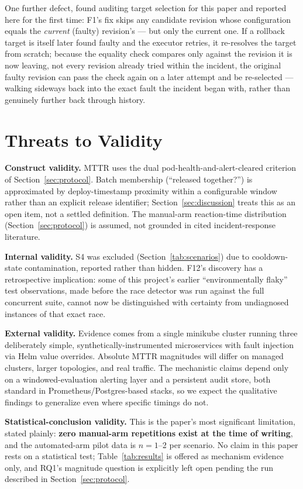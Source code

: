 \documentclass[conference]{IEEEtran}
\begin{document}
One further defect, found auditing target selection for this paper and reported here for the first time: F1's fix skips any candidate revision whose configuration equals the \emph{current} (faulty) revision's --- but only the current one. If a rollback target is itself later found faulty and the executor retries, it re-resolves the target from scratch; because the equality check compares only against the revision it is now leaving, not every revision already tried within the incident, the original faulty revision can pass the check again on a later attempt and be re-selected --- walking sideways back into the exact fault the incident began with, rather than genuinely further back through history.

\section{Threats to Validity}
\label{sec:threats}
\textbf{Construct validity.} MTTR uses the dual pod-health-and-alert-cleared criterion of Section~\ref{sec:protocol}. Batch membership (``released together?'') is approximated by deploy-timestamp proximity within a configurable window rather than an explicit release identifier; Section~\ref{sec:discussion} treats this as an open item, not a settled definition. The manual-arm reaction-time distribution (Section~\ref{sec:protocol}) is assumed, not grounded in cited incident-response literature.

\textbf{Internal validity.} S4 was excluded (Section~\ref{tab:scenarios}) due to cooldown-state contamination, reported rather than hidden. F12's discovery has a retrospective implication: some of this project's earlier ``environmentally flaky'' test observations, made before the race detector was run against the full concurrent suite, cannot now be distinguished with certainty from undiagnosed instances of that exact race.

\textbf{External validity.} Evidence comes from a single minikube cluster running three deliberately simple, synthetically-instrumented microservices with fault injection via Helm value overrides. Absolute MTTR magnitudes will differ on managed clusters, larger topologies, and real traffic. The mechanistic claims depend only on a windowed-evaluation alerting layer and a persistent audit store, both standard in Prometheus/Postgres-based stacks, so we expect the qualitative findings to generalize even where specific timings do not.

\textbf{Statistical-conclusion validity.} This is the paper's most significant limitation, stated plainly: \textbf{zero manual-arm repetitions exist at the time of writing}, and the automated-arm pilot data is $n=1$--2 per scenario. No claim in this paper rests on a statistical test; Table~\ref{tab:results} is offered as mechanism evidence only, and RQ1's magnitude question is explicitly left open pending the run described in Section~\ref{sec:protocol}.
\end{document}
